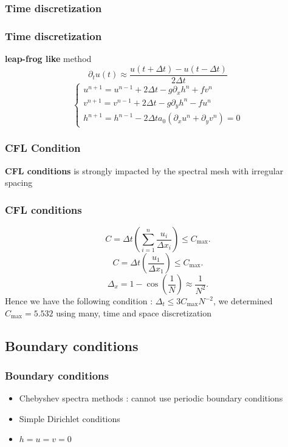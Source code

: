 \documentclass[numbering=fraction]{beamer}
\begin{document}
\subsubsection{Time discretization}
\begin{frame}
    \frametitle{Time discretization}
    \textbf{leap-frog like} method
    $$\partial_t u(t) \approx \frac{u(t + \Delta t) - u(t - \Delta t)}{2\Delta t}$$
    \begin{equation}
        \label{eq:10}
        \begin{cases}
            u^{n+1}  = u^{n-1} + 2\Delta t -g \partial_x h^n + fv^n \\
            v^{n+1}  = v^{n-1} + 2\Delta t -g \partial_y h^n - fu^n \\
            h^{n+1}  = h^{n-1} - 2\Delta t a_0( \partial_x u^n + \partial_y v^n) = 0
        \end{cases}
    \end{equation}
\end{frame}
\subsubsection{CFL Condition}
\begin{frame}
    \textbf{CFL conditions} is strongly impacted by the spectral mesh with irregular spacing
    \frametitle{CFL conditions}
    $$C=\Delta t\left(\sum _{i=1}^{n}{\frac {u_{i}}{\Delta x_{i}}}\right)\leq C_{\max}.$$
    $$C=\Delta t\left(\frac {u_{1}}{\Delta x_{1}}\right)\leq C_{\max }.$$
    $$\Delta_x = 1 - \cos(\frac{1}{N}) \approx \frac{1}{N^2}.$$
    Hence we have the following condition : $\Delta_t \le 3C_{\max} N^{-2}$, we determined $C_{\max} = 5.532$ using many, time and space discretization
\end{frame}

\subsection{Boundary conditions}
\begin{frame}
    \frametitle{Boundary conditions}
    \begin{itemize}
        \item Chebyshev spectra methods : cannot use periodic boundary conditions
        \item Simple Dirichlet conditions
        \item $h = u = v = 0$
    \end{itemize}
\end{frame}
\end{document}
